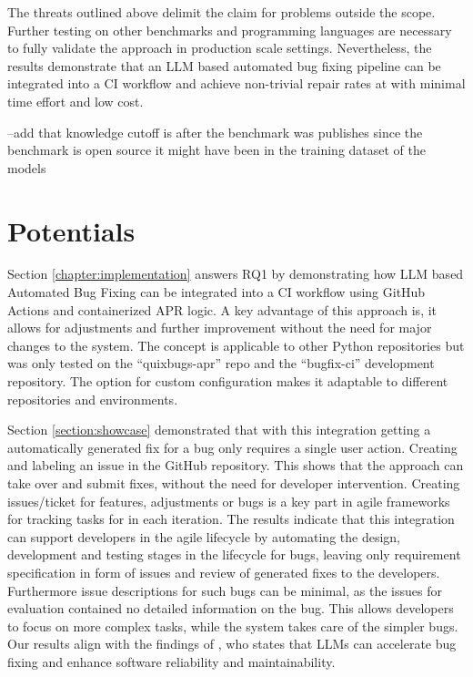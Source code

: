 The threats outlined above delimit the claim for problems outside the scope. Further testing on other benchmarks and programming languages are necessary to fully validate the approach in production scale settings. Nevertheless, the results demonstrate that an LLM based automated bug fixing pipeline can be integrated into a CI workflow and achieve non-trivial repair rates at with minimal time effort and low cost.

--add that knowledge cutoff is after the benchmark was publishes since the benchmark is open source it might have been in the training dataset of the models

\section{Potentials}

Section \ref{chapter:implementation} answers RQ1 by demonstrating how LLM based Automated Bug Fixing can be integrated into a CI workflow using GitHub Actions and containerized APR logic. A key advantage of this approach is, it allows for adjustments and further improvement without the need for major changes to the system.
The concept is applicable to other Python repositories but was only tested on the ``quixbugs-apr'' repo and the ``bugfix-ci'' development repository. The option for custom configuration makes it adaptable to different repositories and environments.

Section \ref{section:showcase} demonstrated that with this integration getting a automatically generated fix for a bug only requires a single user action. Creating and labeling an issue in the GitHub repository. This shows that the approach can take over and submit fixes, without the need for developer intervention. Creating issues/ticket for features, adjustments or bugs is a key part in agile frameworks for tracking tasks for in each iteration. %
The results indicate that this integration can support developers in the agile lifecycle by automating the design, development and testing stages in the lifecycle for bugs, leaving only requirement specification in form of issues and review of generated fixes to the developers. Furthermore issue descriptions for such bugs can be minimal, as the issues for evaluation contained no detailed information on the bug. This allows developers to focus on more complex tasks, while the system takes care of the simpler bugs. Our results align with the findings of \cite{houLargeLanguageModels2024}, who states that LLMs can accelerate bug fixing and enhance software reliability and maintainability.

